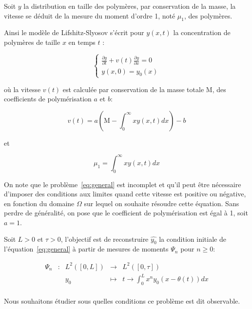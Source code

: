 \documentclass[a4paper]{article}
\newcommand{\mass}{\mathrm{M}}
\newcommand{\pol}{a}
\newcommand{\dep}{b}
\begin{document}
Soit $y$ la distribution en taille des polymères, 
par conservation de la masse,
la vitesse se déduit de la mesure du moment d'ordre 1, noté $\mu_1$, des polymères.

Ainsi le modèle de Lifshitz-Slyosov s'écrit pour $y(x,t)$ la concentration de polymères de taille $x$ en temps $t$ :

\begin{equation}
\label{eq:general}
\begin{cases}
 \displaystyle \frac{\partial y}{\partial t}+ v(t) \frac{\partial y} {\partial x}  = 0  \\
 y(x,0) = y_{0} (x) 
\end{cases}
\end{equation}

où la vitesse $v(t)$ est calculée par conservation de la masse totale $\mass$, des coefficients de polymérisation $\pol$ et $\dep$:

\[
v(t) = \pol(\mass - \int_0 ^\infty x y(x,t) dx)-\dep
\]

et 

\[
\mu_1 = \int_0 ^\infty x y(x,t) dx
\]

 On note que le problème~\eqref{eq:general} est incomplet et qu'il peut être nécessaire d'imposer des conditions aux limites quand cette vitesse est positive ou négative, en fonction du domaine $\Omega$ sur lequel on souhaite résoudre cette équation.
Sans perdre de généralité, 
on pose que le coefficient de polymérisation est égal à 1, 
soit $\pol =1$.

Soit $L>0$ et $\tau>0$, l'objectif est de reconstruire $\hat{y_0}$ 
la condition initiale de l'équation~\eqref{eq:general} 
à partir de mesures de moments $\Psi_n$ pour $n \geq 0$:

 \begin{equation}
	\begin{array}{ccccc}
	\Psi_n & : & L^2([0,L]) & \to & L^2([0,\tau]) \\
	 & & y_0 & \mapsto & t \to \int_0^L x^n y_0(x-\theta(t)) dx\\
	\end{array}
\end{equation}

Nous souhaitons étudier sous quelles conditions ce problème est dit observable.


\end{document}
